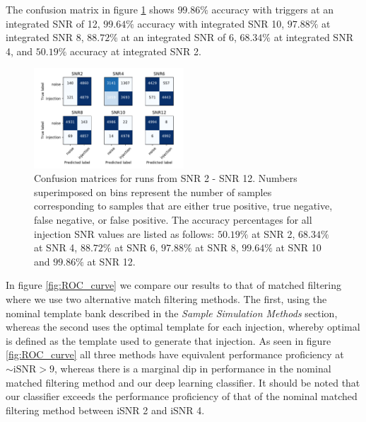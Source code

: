 \documentclass[%
 amsmath,amssymb,
 aps,
 twocolumn,
 prl,
 reprint,
floatfix,
]{revtex4-1}
\begin{document}
The confusion matrix in figure \ref{fig:confusion} shows $99.86\%$ accuracy
with triggers at an integrated SNR of 12, $99.64\%$ accuracy with integrated
SNR 10, $97.88\%$ at integrated SNR 8, $88.72\%$ at an integrated SNR of 6,
$68.34\%$ at integrated SNR 4, and $50.19\%$ accuracy at integrated SNR 2.


\begin{figure}[]
\includegraphics[width=0.5\textwidth] {figures/confusion_matrix.pdf}
\caption{\label{fig:confusion} Confusion matrices for runs from SNR 2 - SNR 12.
Numbers superimposed on bins represent the number of samples corresponding to
samples that are either true positive, true negative, false negative, or false
positive. The accuracy percentages for all injection SNR values are listed as
follows: $50.19\%$ at SNR 2, $68.34\%$ at SNR 4, $88.72\%$ at SNR 6, $97.88\%$
at SNR 8, $99.64\%$ at SNR 10 and $99.86\%$ at SNR 12.}
\end{figure}

In figure \ref{fig:ROC_curve} we compare our results to that of matched
filtering where we use two alternative match filtering methods. The first,
using the nominal template bank described in the \textit{Sample Simulation
Methods} section, whereas the second uses the optimal template for each
injection, whereby optimal is defined as the template used to generate that
injection. As seen in figure \ref{fig:ROC_curve} all three methods have
equivalent performance proficiency at $\sim \mathrm{iSNR} > 9$, whereas there
is a marginal dip in performance in the nominal matched filtering method and
our deep learning classifier. It should be noted that our classifier exceeds
the performance proficiency of that of the nominal matched filtering method
between iSNR 2 and iSNR 4. 
\end{document}
